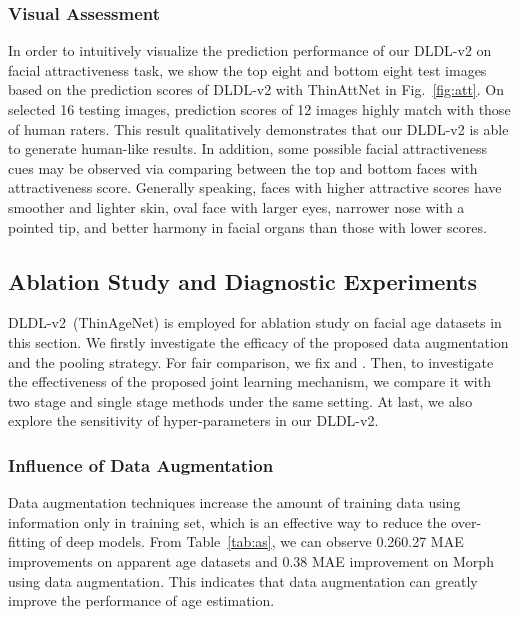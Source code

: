 \documentclass[5p,times,twocolumn]{elsarticle}
\begin{document}
\subsubsection{Visual Assessment}
In order to intuitively visualize the prediction performance of our DLDL-v2 on facial attractiveness task, we show the top eight and bottom eight test images based on the prediction scores of DLDL-v2 with ThinAttNet in Fig.~\ref{fig:att}. On selected 16 testing images, prediction scores of 12 images highly match with those of human raters. This result qualitatively demonstrates that our DLDL-v2 is able to generate human-like results. In addition, some possible facial attractiveness cues may be observed via comparing between the top and bottom faces with attractiveness score. Generally speaking, faces with higher attractive scores have smoother and lighter skin, oval face with larger eyes, narrower nose with a pointed tip, and better harmony in facial organs than those with lower scores.

\subsection{Ablation Study and Diagnostic Experiments}

DLDL-v2~(ThinAgeNet) is employed for ablation study on facial age datasets in this section. We firstly investigate the efficacy of the proposed data augmentation and the pooling strategy. For fair comparison, we fix  and . Then, to investigate the effectiveness of the proposed joint learning mechanism, we compare it with two stage and single stage methods under the same setting. At last, we also explore the sensitivity of hyper-parameters in our DLDL-v2. 

\subsubsection{Influence of Data Augmentation} 
Data augmentation techniques increase the amount of training data using information only in training set, which is an effective way to reduce the over-fitting of deep models. From Table~\ref{tab:as}, we can observe 0.260.27 MAE improvements on apparent age datasets and 0.38 MAE improvement on Morph using data augmentation. This indicates that data augmentation can greatly improve the performance of age estimation.
\end{document}
